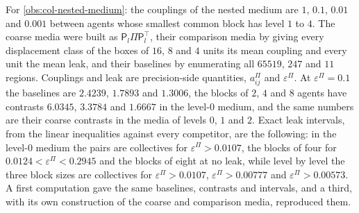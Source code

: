 \begin{numcheck}\label{chk:col-nested-medium}
For \cref{obs:col-nested-medium}: the couplings of the nested medium are $1$, $0.1$, $0.01$ and $0.001$ between agents whose smallest common block has level $1$ to $4$. The coarse media were built as $\mathsf P_l\Pi\mathsf P_l^\top$, their comparison media by giving every displacement class of the boxes of $16$, $8$ and $4$ units its mean coupling and every unit the mean leak, and their baselines by enumerating all $65519$, $247$ and $11$ regions. Couplings and leak are precision-side quantities, $a^\Pi_{ij}$ and $\varepsilon^\Pi$. At $\varepsilon^\Pi=0.1$ the baselines are $2.4239$, $1.7893$ and $1.3006$, the blocks of $2$, $4$ and $8$ agents have contrasts $6.0345$, $3.3784$ and $1.6667$ in the level-$0$ medium, and the same numbers are their coarse contrasts in the media of levels $0$, $1$ and $2$. Exact leak intervals, from the linear inequalities against every competitor, are the following: in the level-$0$ medium the pairs are collectives for $\varepsilon^\Pi>0.0107$, the blocks of four for $0.0124<\varepsilon^\Pi<0.2945$ and the blocks of eight at no leak, while level by level the three block sizes are collectives for $\varepsilon^\Pi>0.0107$, $\varepsilon^\Pi>0.00777$ and $\varepsilon^\Pi>0.00573$. A first computation gave the same baselines, contrasts and intervals, and a third, with its own construction of the coarse and comparison media, reproduced them.
\end{numcheck}

